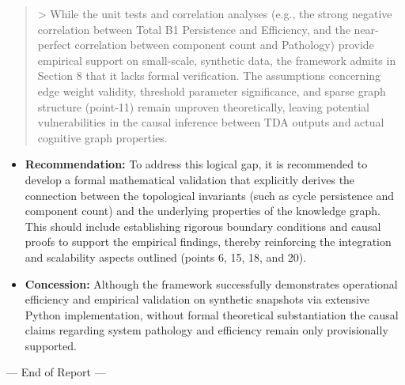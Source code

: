 \documentclass[12pt]{article}
\begin{document}
\begin{quote}
> While the unit tests and correlation analyses (e.g., the strong negative correlation between Total B1 Persistence and Efficiency, and the near-perfect correlation between component count and Pathology) provide empirical support on small-scale, synthetic data, the framework admits in Section 8 that it lacks formal verification. The assumptions concerning edge weight validity, threshold parameter significance, and sparse graph structure (point-11) remain unproven theoretically, leaving potential vulnerabilities in the causal inference between TDA outputs and actual cognitive graph properties.
\end{quote}
\begin{itemize}
  \item \textbf{Recommendation:} To address this logical gap, it is recommended to develop a formal mathematical validation that explicitly derives the connection between the topological invariants (such as cycle persistence and component count) and the underlying properties of the knowledge graph. This should include establishing rigorous boundary conditions and causal proofs to support the empirical findings, thereby reinforcing the integration and scalability aspects outlined (points 6, 15, 18, and 20).
  \item \textbf{Concession:} Although the framework successfully demonstrates operational efficiency and empirical validation on synthetic snapshots via extensive Python implementation, without formal theoretical substantiation the causal claims regarding system pathology and efficiency remain only provisionally supported.
\end{itemize}
\hrulefill

--- End of Report ---



\end{document}
